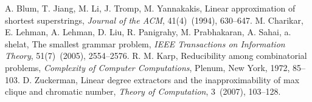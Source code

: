 \documentclass{article}
\begin{document}
\begin{thebibliography}{4}
A. Blum, T. Jiang, M. Li, J. Tromp, M. Yannakakis,
Linear approximation of shortest superstrings,
\emph{Journal of the ACM},
41(4)~(1994), 630--647.
M. Charikar, E. Lehman, A. Lehman, D. Liu, R. Panigrahy, M. Prabhakaran, A. Sahai, a. shelat,
The smallest grammar problem,
\emph{IEEE Transactions on Information Theory},
51(7)~(2005), 2554--2576.
R. M. Karp, 
Reducibility among combinatorial problems,
\emph{Complexity of Computer Computations},
Plenum, New York, 1972, 85--103.
D. Zuckerman,
Linear degree extractors and the inapproximability of max clique and chromatic number,
\emph{Theory of Computation},
3~(2007), 103--128.
\end{thebibliography}
\end{document}
